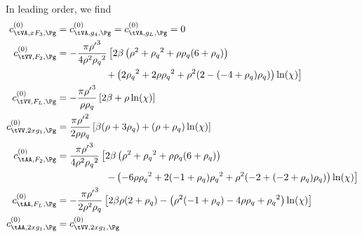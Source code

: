 In leading order, we find
\begin{align}
c^{(0)}_{\tVA,xF_3,\Pg} &= c^{(0)}_{\tVA,g_4,\Pg} = c^{(0)}_{\tVA,g_L,\Pg} = 0\\
c^{(0)}_{\tVV,F_2,\Pg} &= -\frac{\pi {\rho'}^3 }{4 \rho ^2 {\rho_q}^2}\left[2\beta\left(\rho ^2+{\rho_q}^2+\rho  {\rho_q} (6+{\rho_q})\right) \right.\nonumber\\
 &\hspace{50pt}\left.+\left(2 {\rho_q}^2+2 \rho  {\rho_q}^2+\rho ^2 (2-(-4+{\rho_q}) {\rho_q})\right) \ln(\chi)\right]\\
c^{(0)}_{\tVV,F_L,\Pg} &= -\frac{\pi{\rho'}^3}{\rho\rho_q}\left[2\beta + \rho\ln(\chi)\right]\\
c^{(0)}_{\tVV,2xg_1,\Pg} &= \frac{\pi{\rho'}^2}{2\rho\rho_q}\left[\beta(\rho+3\rho_q) + (\rho+\rho_q)\ln(\chi)\right]\\
c^{(0)}_{\tAA,F_2,\Pg} &= \frac{\pi {\rho'}^3}{4\rho^2{\rho_q}^2}\left[ 2\beta\left(\rho ^2+{\rho_q}^2+\rho  {\rho_q} (6+{\rho_q})\right) \right.\nonumber\\
 &\hspace{50pt} \left. - \left(-6 \rho  {\rho_q}^2+2 (-1+{\rho_q}) {\rho_q}^2+\rho ^2 (-2+(-2+{\rho_q}) {\rho_q})\right) \ln(\chi) \right] \\
c^{(0)}_{\tAA,F_L,\Pg} &=-\frac{\pi{\rho'}^3}{2\rho^2\rho_q}\left[2\beta\rho(2+\rho_q) - \left(\rho ^2 (-1+{\rho_q})-4 \rho  {\rho_q}+{\rho_q}^2\right) \ln(\chi)\right]\\
c^{(0)}_{\tAA,2xg_1,\Pg} &= c^{(0)}_{\tVV,2xg_1,\Pg}
\end{align}

